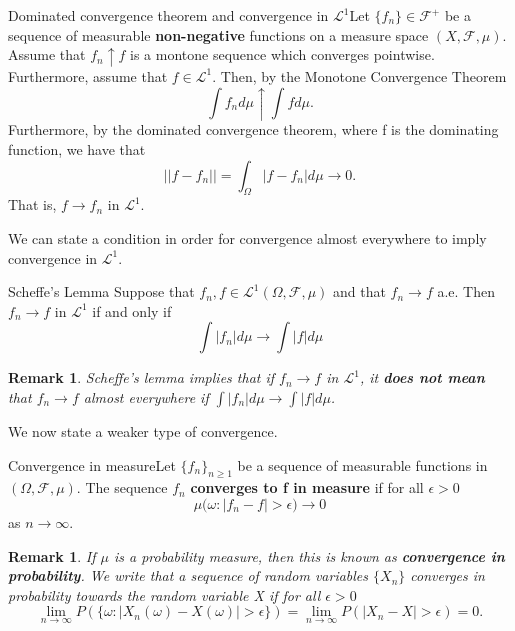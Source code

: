 \documentclass[twoside]{article}
\newtheorem{remark}[theorem]{Remark}
\newcommand{\sigmalgebra}{\mathcal{F}}
\begin{document}
\begin{proposition_exam}{Dominated convergence theorem and convergence in $\mathcal{L}^1$}{}Let $\{f_n\} \in \sigmalgebra^+$ be a sequence of measurable \textbf{non-negative} functions on a measure space $(X, \mathcal{F}, \mu)$. Assume that $f_n \uparrow f$ is a montone sequence which converges pointwise. Furthermore, assume that $f \in \mathcal{L}^1.$ Then, by the Monotone Convergence Theorem $$\int f_nd\mu \uparrow \int fd\mu.$$ Furthermore, by the dominated convergence theorem, where f is the dominating function, we have that 
$$
||f - f_n|| = \int_{\Omega}|f - f_n|d\mu \rightarrow 0.
$$
That is, $f \rightarrow f_n $ in $\mathcal{L}^1.$
\end{proposition_exam}

We can state a condition in order for convergence almost everywhere to imply convergence in $\mathcal{L}^1$.

\begin{theorem_exam}{Scheffe's Lemma}{} Suppose that $f_n, f \in \mathcal{L}^1(\Omega, \mathcal{F}, \mu)$ and that $f_n \rightarrow f$ a.e. Then $f_n \rightarrow f$ in $\mathcal{L}^1$ if and only if $$\int |f_n|d\mu \rightarrow \int |f|d\mu$$
\end{theorem_exam}


\begin{remark}Scheffe's lemma implies that if $f_n \rightarrow f$ in $\mathcal{L}^1$, it \textbf{does not mean} that $f_n \rightarrow f$ almost everywhere if $\int |f_n|d\mu \rightarrow \int |f|d\mu$.
\end{remark}


We now state a weaker type of convergence.

\begin{definition_exam}{Convergence in measure}{}Let $\{f_n\}_{n \geq 1}$ be a sequence of measurable functions in $(\Omega, \sigmalgebra, \mu)$. The sequence $f_n$ \textbf{converges to f in measure} if for all $\epsilon > 0$
$$
\mu\bigg(\omega: |f_n - f| > \epsilon \bigg) \rightarrow 0
$$
as $n \rightarrow \infty.$
\end{definition_exam}

\begin{remark}If $\mu$ is a probability measure, then this is known as \textbf{convergence in probability}. We write that a sequence of random variables $\{X_n\}$ converges in probability towards the random variable X if for all $\epsilon > 0$ 
$$
\lim_{n \rightarrow \infty}P(\{\omega: |X_n(\omega) - X(\omega)| > \epsilon\}) = \lim_{n \rightarrow \infty}P(|X_n - X| > \epsilon) = 0.
$$
\end{remark}
\end{document}
